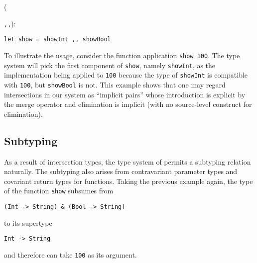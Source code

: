 ({\lstinline{,,}):
\begin{lstlisting}
let show = showInt ,, showBool
\end{lstlisting}

To illustrate the usage, consider the function application \lstinline{show 100}.
The type system will pick the first component of \lstinline{show}, namely
\lstinline{showInt}, as the implementation being applied to \lstinline{100}
because the type of \lstinline{showInt} is compatible with \lstinline{100}, but
\lstinline{showBool} is not. This example shows that one may regard
intersections in our system as ``implicit pairs'' whose introduction is explicit
by the merge operator and elimination is implicit (with no source-level
construct for elimination).








\subsection{Subtyping}


As a result of intersection types, the type system of \name permits a subtyping
relation naturally. The subtyping also arises from contravariant parameter types
and covariant return types for functions. Taking the previous example again, the
type of the function \lstinline{show} subsumes from
\begin{lstlisting}
(Int -> String) & (Bool -> String)
\end{lstlisting}
to its supertype
\begin{lstlisting}
Int -> String
\end{lstlisting}
and therefore can take \lstinline{100} as its argument.

}
